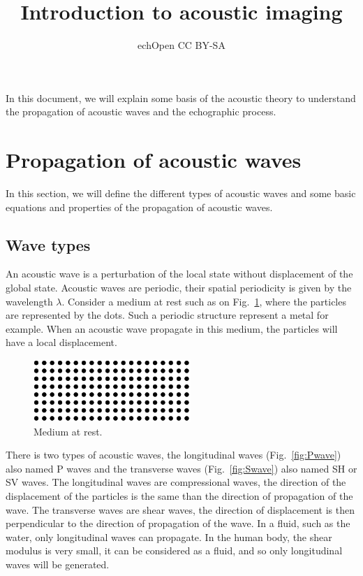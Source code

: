 \documentclass[a4paper,twoside,11pt]{article}
\title{\large{Introduction to acoustic imaging}}
\author{\large{echOpen CC BY-SA}}
\begin{document}

\clearpage

\tableofcontents
\clearpage

In this document, we will explain some basis of the acoustic theory to 
understand the propagation of acoustic waves and the echographic process.

\section{Propagation of acoustic waves}
\label{sec:Propagation of acoustic waves}

In this section, we will define the different types of acoustic waves and some 
basic equations and properties of the propagation of acoustic waves.

\subsection{Wave types}
\label{sec:wave types}

\FloatBarrier

An acoustic wave is a perturbation of the local state without displacement of 
the global state. Acoustic waves are periodic, their spatial periodicity is 
given by the wavelength $\lambda$. Consider a medium at rest such as on 
Fig.~\ref{fig:at_rest}, where the particles are represented by the dots. Such a 
periodic structure represent a metal for example. When an acoustic wave 
propagate in this medium, the particles will have a local displacement.

\begin{figure}[htb]
	\centering
		\includegraphics{image/at_rest}
	\caption{Medium at rest.}
	\label{fig:at_rest}
\end{figure}

There is two types of acoustic waves, the longitudinal waves 
(Fig.~\ref{fig:Pwave}) also named P waves and the transverse 
waves (Fig.~\ref{fig:Swave}) also named SH or SV waves. The longitudinal waves 
are compressional waves, the direction of the 
displacement of the particles is the same than the direction of propagation of 
the wave. The transverse waves are shear waves, the direction of displacement 
is then perpendicular to the direction of propagation of the wave. In a fluid, 
such as the water, only longitudinal waves can propagate. In the human body, 
the 
shear modulus is very small, it can be considered as a fluid, and so only 
longitudinal waves will be generated.
\end{document}
